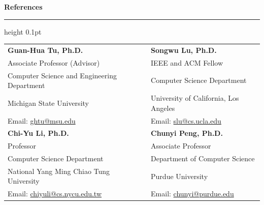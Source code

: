 

{\large\bf References}
\medskip\hrule height 0.1pt
\vspace{1mm}				

\begin{tabular}{p{} p{}}
\textbf{Guan-Hua Tu, Ph.D.} & \textbf{Songwu Lu, Ph.D.} \\[0.3em]
Associate Professor (Advisor)    & IEEE and ACM Fellow \\[0.1em]
Computer Science and Engineering Department & Computer Science Department\\[0.1em]
Michigan State University & University of California, Los Angeles\\[0.1em]
Email: \href{mailto:ghtu@msu.edu}{ghtu@msu.edu} & Email: \href{mailto:slu@cs.ucla.edu}{slu@cs.ucla.edu} \\[1em]
\textbf{Chi-Yu Li, Ph.D.} & \textbf{Chunyi Peng, Ph.D.}\\[0.3em]
Professor & Associate Professor\\
Computer Science Department & Department of Computer Science\\
National Yang Ming Chiao Tung University & Purdue University\\
Email: \href{mailto:chiyuli@cs.nycu.edu.tw}{chiyuli@cs.nycu.edu.tw} & Email: \href{mailto:chunyi@purdue.edu}{chunyi@purdue.edu} \\
\end{tabular}


				









